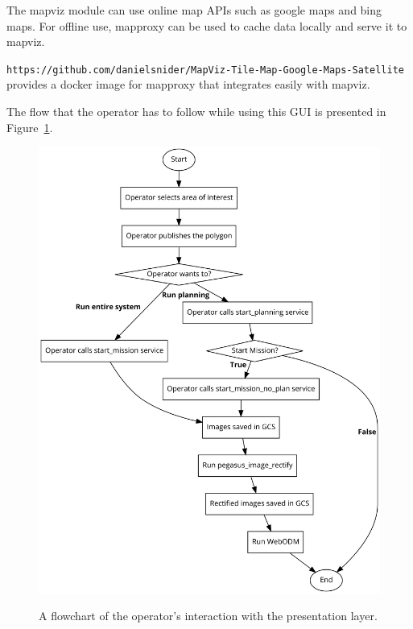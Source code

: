 The mapviz module can use online map APIs such as google maps and bing maps. For offline use, mapproxy can be used to cache data locally and serve it to mapviz.

\texttt{https://github.com/danielsnider/MapViz-Tile-Map-Google-Maps-Satellite} provides a docker image for mapproxy that integrates easily with mapviz.

The flow that the operator has to follow while using this GUI is presented in Figure~\ref{fig:presentation-flow}.

\begin{figure}
	\centering
	\caption[Operator interaction with Pegasus system]{\small A flowchart of the operator's interaction with the presentation layer.}
	\includegraphics[width=5in]{figures/methodology/presentation/presentation-flow}
	\label{fig:presentation-flow}
\end{figure}



